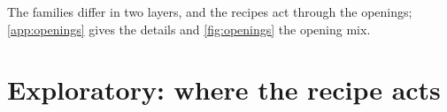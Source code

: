 \documentclass[11pt]{article}
\begin{document}
The families differ in two layers, and the recipes act through the openings; \cref{app:openings} gives the details and \cref{fig:openings} the opening mix.

\section{Exploratory: where the recipe acts}
\label{sec:mechanism}
\end{document}
